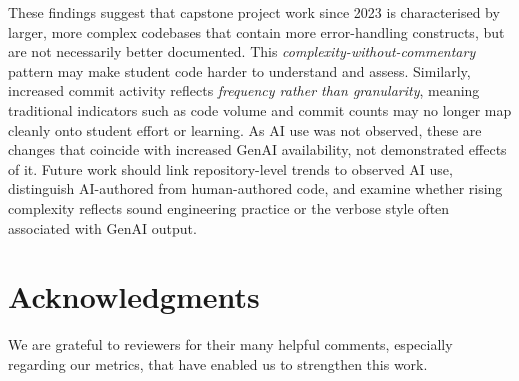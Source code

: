 \documentclass[sigconf,authorversion]{acmart}
\newcommand{\todo}[1]{#1}
\begin{document}
These findings suggest that capstone project work \todo{since 2023} is characterised by larger, more complex codebases that contain more \todo{error-handling constructs}, but are not necessarily better documented. This \emph{complexity-without-commentary} pattern may make student code harder to understand and assess. Similarly, increased commit activity reflects \emph{frequency rather than granularity}, meaning traditional indicators such as code volume and commit counts may no longer map cleanly onto student effort or learning. \todo{As AI use was not observed, these are changes that coincide with increased GenAI availability, not demonstrated effects of it.}
Future work should link repository-level trends to observed AI use, distinguish AI-authored from human-authored code, and examine whether rising complexity reflects sound engineering practice or the verbose style often associated with GenAI output.

\section*{\todo{Acknowledgments}}
\todo{We are grateful to reviewers for their many helpful comments, especially regarding our metrics, that have enabled us to strengthen this work.}


\balance 

\end{document}

